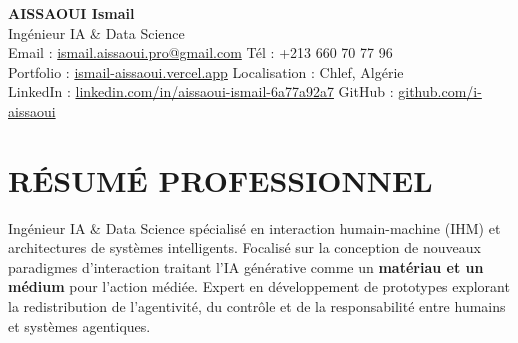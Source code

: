 \documentclass[a4paper,12pt]{article}
\begin{document}
\begin{center}
    {\Huge\bfseries\color{titleblue} AISSAOUI Ismail}\\[4pt]
    {\Large Ingénieur IA \& Data Science}\\[6pt]

    {\normalsize
    Email : \href{mailto:ismail.aissaoui.pro@gmail.com}{ismail.aissaoui.pro@gmail.com} \quad
    Tél : +213 660 70 77 96 \\
    Portfolio : \href{https://ismail-aissaoui.vercel.app}{ismail-aissaoui.vercel.app} \quad
    Localisation : Chlef, Algérie \\
    LinkedIn : \href{https://linkedin.com/in/aissaoui-ismail-6a77a92a7}{linkedin.com/in/aissaoui-ismail-6a77a92a7} \quad
    GitHub : \href{https://github.com/i-aissaoui}{github.com/i-aissaoui}
    }
\end{center}

\section{RÉSUMÉ PROFESSIONNEL}
Ingénieur IA \& Data Science spécialisé en interaction humain-machine (IHM) et architectures de systèmes intelligents. Focalisé sur la conception de nouveaux paradigmes d'interaction traitant l'IA générative comme un \textbf{matériau et un médium} pour l'action médiée. Expert en développement de prototypes explorant la redistribution de l'agentivité, du contrôle et de la responsabilité entre humains et systèmes agentiques.

\end{document}
